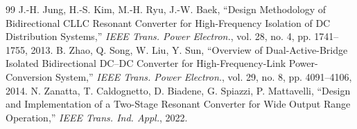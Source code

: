 \documentclass[10pt,a4paper,twocolumn]{article}
\begin{document}
\begin{thebibliography}{99}
 J.-H. Jung, H.-S. Kim, M.-H. Ryu, J.-W. Baek, “Design Methodology of Bidirectional CLLC Resonant Converter for High-Frequency Isolation of DC Distribution Systems,” \textit{IEEE Trans. Power Electron.}, vol. 28, no. 4, pp. 1741–1755, 2013.
 B. Zhao, Q. Song, W. Liu, Y. Sun, “Overview of Dual-Active-Bridge Isolated Bidirectional DC–DC Converter for High-Frequency-Link Power-Conversion System,” \textit{IEEE Trans. Power Electron.}, vol. 29, no. 8, pp. 4091–4106, 2014.
 N. Zanatta, T. Caldognetto, D. Biadene, G. Spiazzi, P. Mattavelli, “Design and Implementation of a Two-Stage Resonant Converter for Wide Output Range Operation,” \textit{IEEE Trans. Ind. Appl.}, 2022.
\end{thebibliography}
\endgroup
\end{document}
